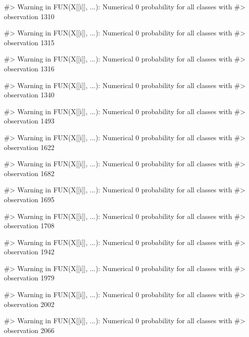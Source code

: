 \begin{Schunk}
\begin{Soutput}
#> Warning in FUN(X[[i]], ...): Numerical 0 probability for all classes with
#> observation 1310
\end{Soutput}
\begin{Soutput}
#> Warning in FUN(X[[i]], ...): Numerical 0 probability for all classes with
#> observation 1315
\end{Soutput}
\begin{Soutput}
#> Warning in FUN(X[[i]], ...): Numerical 0 probability for all classes with
#> observation 1316
\end{Soutput}
\begin{Soutput}
#> Warning in FUN(X[[i]], ...): Numerical 0 probability for all classes with
#> observation 1340
\end{Soutput}
\begin{Soutput}
#> Warning in FUN(X[[i]], ...): Numerical 0 probability for all classes with
#> observation 1493
\end{Soutput}
\begin{Soutput}
#> Warning in FUN(X[[i]], ...): Numerical 0 probability for all classes with
#> observation 1622
\end{Soutput}
\begin{Soutput}
#> Warning in FUN(X[[i]], ...): Numerical 0 probability for all classes with
#> observation 1682
\end{Soutput}
\begin{Soutput}
#> Warning in FUN(X[[i]], ...): Numerical 0 probability for all classes with
#> observation 1695
\end{Soutput}
\begin{Soutput}
#> Warning in FUN(X[[i]], ...): Numerical 0 probability for all classes with
#> observation 1708
\end{Soutput}
\begin{Soutput}
#> Warning in FUN(X[[i]], ...): Numerical 0 probability for all classes with
#> observation 1942
\end{Soutput}
\begin{Soutput}
#> Warning in FUN(X[[i]], ...): Numerical 0 probability for all classes with
#> observation 1979
\end{Soutput}
\begin{Soutput}
#> Warning in FUN(X[[i]], ...): Numerical 0 probability for all classes with
#> observation 2002
\end{Soutput}
\begin{Soutput}
#> Warning in FUN(X[[i]], ...): Numerical 0 probability for all classes with
#> observation 2066
\end{Soutput}

\end{Schunk}
